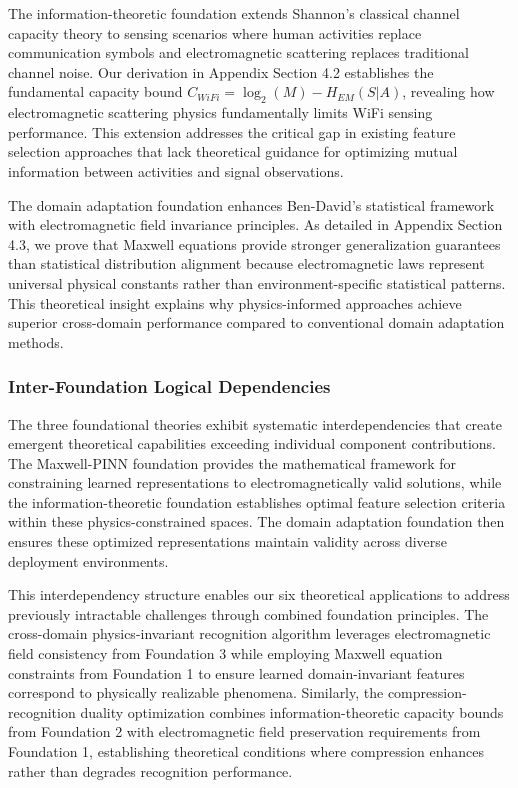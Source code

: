 \documentclass[journal]{IEEEtran}
\begin{document}
The information-theoretic foundation extends Shannon's classical channel capacity theory to sensing scenarios where human activities replace communication symbols and electromagnetic scattering replaces traditional channel noise. Our derivation in Appendix Section 4.2 establishes the fundamental capacity bound $C_{WiFi} = \log_2(M) - H_{EM}(S|A)$, revealing how electromagnetic scattering physics fundamentally limits WiFi sensing performance. This extension addresses the critical gap in existing feature selection approaches that lack theoretical guidance for optimizing mutual information between activities and signal observations.

The domain adaptation foundation enhances Ben-David's statistical framework with electromagnetic field invariance principles. As detailed in Appendix Section 4.3, we prove that Maxwell equations provide stronger generalization guarantees than statistical distribution alignment because electromagnetic laws represent universal physical constants rather than environment-specific statistical patterns. This theoretical insight explains why physics-informed approaches achieve superior cross-domain performance compared to conventional domain adaptation methods.

\subsubsection{Inter-Foundation Logical Dependencies}

The three foundational theories exhibit systematic interdependencies that create emergent theoretical capabilities exceeding individual component contributions. The Maxwell-PINN foundation provides the mathematical framework for constraining learned representations to electromagnetically valid solutions, while the information-theoretic foundation establishes optimal feature selection criteria within these physics-constrained spaces. The domain adaptation foundation then ensures these optimized representations maintain validity across diverse deployment environments.

This interdependency structure enables our six theoretical applications to address previously intractable challenges through combined foundation principles. The cross-domain physics-invariant recognition algorithm leverages electromagnetic field consistency from Foundation 3 while employing Maxwell equation constraints from Foundation 1 to ensure learned domain-invariant features correspond to physically realizable phenomena. Similarly, the compression-recognition duality optimization combines information-theoretic capacity bounds from Foundation 2 with electromagnetic field preservation requirements from Foundation 1, establishing theoretical conditions where compression enhances rather than degrades recognition performance.
\end{document}
